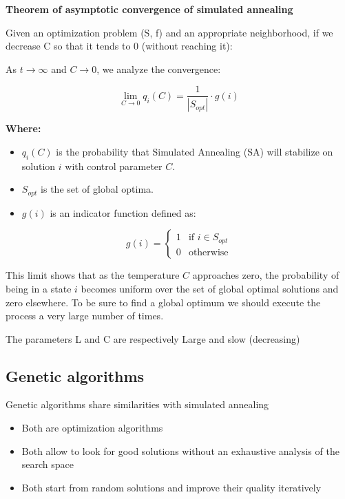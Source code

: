 \vspace{10pt}

\textbf{Theorem of asymptotic convergence of simulated annealing}

\vspace{10pt}

Given an optimization problem (S, f) and an appropriate neighborhood, if we decrease C so that it tends to 0 (without reaching it):

\noindent
As $t \rightarrow \infty$ and $C \rightarrow 0$, we analyze the convergence:

\[
\lim_{C \to 0} q_i(C) = \frac{1}{|S_{opt}|} \cdot g(i)
\]

\noindent
\textbf{Where:}
\begin{itemize}
    \item $q_i(C)$ is the probability that Simulated Annealing (SA) will stabilize on solution $i$ with control parameter $C$.
    \item $S_{opt}$ is the set of global optima.
    \item $g(i)$ is an indicator function defined as:
\end{itemize}

\[
g(i) = 
\begin{cases} 
    1 & \text{if } i \in S_{opt} \\
    0 & \text{otherwise}
\end{cases}
\]

\vspace{10pt}
\noindent
This limit shows that as the temperature $C$ approaches zero, the probability of being in a state $i$ becomes uniform over the set of global optimal solutions and zero elsewhere. To be sure to find a global optimum we should execute the process a very large number of times.

\vspace{10pt}

The parameters L and C are respectively Large and slow (decreasing)

\subsection{Genetic algorithms}

Genetic algorithms share similarities with simulated annealing

\begin{itemize}
    \item Both are optimization algorithms
    \item Both allow to look for good solutions without an exhaustive analysis of the search space
    \item Both start from random solutions and improve their quality iteratively
\end{itemize} 

